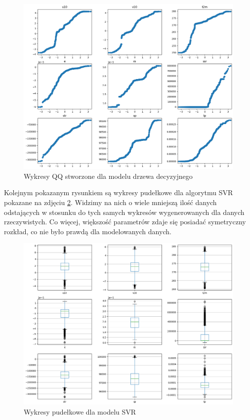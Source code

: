 \begin{figure}[H]
    \centering
    \includegraphics[width=\textwidth]{images/dt_qq.png}
    \caption{Wykresy QQ stworzone dla modelu drzewa decyzyjnego}
    \label{dt-qq}
\end{figure}

Kolejnym pokazanym rysunkiem są wykresy pudełkowe dla algorytmu SVR pokazane na zdjęciu \ref{svr-box}. 
Widzimy na nich o wiele mniejszą ilość
danych odstających w stosunku do tych samych wykresów wygenerowanych dla danych rzeczywistych. Co więcej,
większość parametrów zdaje się posiadać symetryczny rozkład, co nie było prawdą dla modelowanych danych.

\begin{figure}[H]
    \centering
    \includegraphics[width=.8\textwidth]{images/svr_box.png}
    \caption{Wykresy pudełkowe dla modelu SVR}
    \label{svr-box}
\end{figure}

